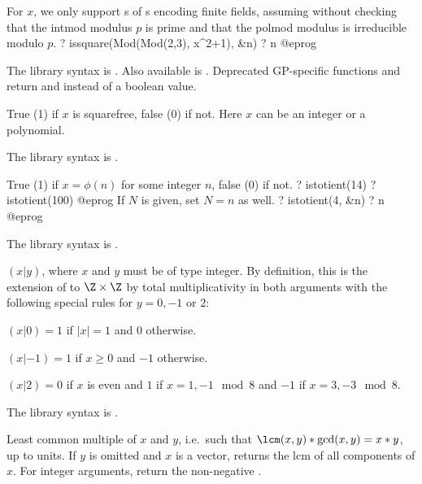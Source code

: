 For  $x$, we only support s of s
encoding finite fields, assuming without checking that the intmod modulus
$p$ is prime and that the polmod modulus is irreducible modulo $p$.
\bprog
? issquare(Mod(Mod(2,3), x^2+1), &n)
? n
@eprog

The library syntax is .
Also available is . Deprecated
GP-specific functions  and
 return  and 
instead of a boolean value.

\label{se:issquarefree}
True (1) if $x$ is squarefree, false (0) if not. Here $x$ can be an
integer or a polynomial.

The library syntax is .

\label{se:istotient}
True (1) if $x = \phi(n)$ for some integer $n$, false (0)
if not.
\bprog
? istotient(14)
? istotient(100)
@eprog
If $N$ is given, set $N = n$ as well.
\bprog
? istotient(4, &n)
? n
@eprog

The library syntax is .

\label{se:kronecker}
 $(x|y)$, where $x$ and $y$ must be of type integer. By
definition, this is the extension of  to $\Z \times \Z$
by total multiplicativity in both arguments with the following special rules
for $y = 0, -1$ or $2$:

\item $(x|0) = 1$ if $|x| = 1$ and $0$ otherwise.

\item $(x|-1) = 1$ if $x \geq 0$ and $-1$ otherwise.

\item $(x|2) = 0$ if $x$ is even and $1$ if $x = 1,-1 \mod 8$ and $-1$
if $x=3,-3 \mod 8$.

The library syntax is .

\label{se:lcm}
Least common multiple of $x$ and $y$, i.e.~such
that $\lcm(x,y)*\gcd(x,y) = x*y$, up to units. If $y$ is omitted and $x$
is a vector, returns the $\text{lcm}$ of all components of $x$.
For integer arguments, return the non-negative .

